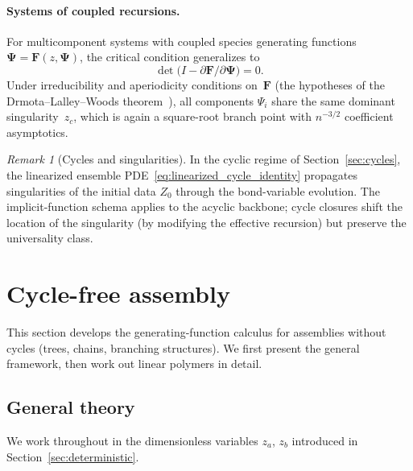 \documentclass[11pt]{amsart}
\newcommand{\GFensemble}{Z}
\newcommand{\GFcomb}{\Psi}
\theoremstyle{definition}
\theoremstyle{plain}
\theoremstyle{remark}
\newtheorem*{remark}{Remark}
\begin{document}
\paragraph{Systems of coupled recursions.}
For multicomponent systems with coupled species generating functions $\boldsymbol{\GFcomb} = \mathbf{F}(z,\boldsymbol{\GFcomb})$, the critical condition generalizes to
\begin{equation}\label{eq:dlw_condition}
\det\!\bigl(I - \partial\mathbf{F}/\partial\boldsymbol{\GFcomb}\bigr) = 0.
\end{equation}
Under irreducibility and aperiodicity conditions on~$\mathbf{F}$ (the hypotheses of the Drmota--Lalley--Woods theorem~\cite{drmota2009random,flajolet2009analytic}), all components $\GFcomb_i$ share the same dominant singularity~$z_c$, which is again a square-root branch point with $n^{-3/2}$ coefficient asymptotics.

\begin{remark}[Cycles and singularities]
In the cyclic regime of Section~\ref{sec:cycles}, the linearized ensemble PDE~\eqref{eq:linearized_cycle_identity} propagates singularities of the initial data $\GFensemble_0$ through the bond-variable evolution.
The implicit-function schema applies to the acyclic backbone; cycle closures shift the location of the singularity (by modifying the effective recursion) but preserve the universality class.
\end{remark}


\section{Cycle-free assembly}
\label{sec:cyclefree}

This section develops the generating-function calculus for assemblies without cycles (trees, chains, branching structures).
We first present the general framework, then work out linear polymers in detail.

\subsection{General theory}
\label{sec:cyclefree_general}

We work throughout in the dimensionless variables $z_a$, $z_b$ introduced in Section~\ref{sec:deterministic}.
\end{document}

